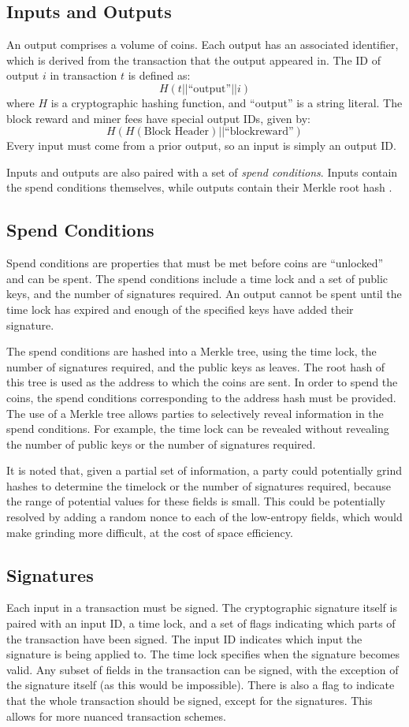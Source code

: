 \documentclass[twocolumn]{article}
\begin{document}
\subsection{Inputs and Outputs}
An output comprises a volume of coins.
Each output has an associated identifier, which is derived from the transaction that the output appeared in.
The ID of output $i$ in transaction $t$ is defined as:
\[
	H(t || \text{``output''} || i)
\]
where $H$ is a cryptographic hashing function, and ``output'' is a string literal.
The block reward and miner fees have special output IDs, given by:
\[
	H(H(\text{Block Header}) || \text{``blockreward''})
\]
Every input must come from a prior output, so an input is simply an output ID.

Inputs and outputs are also paired with a set of \textit{spend conditions}.
Inputs contain the spend conditions themselves, while outputs contain their Merkle root hash \cite{merkle}.

\subsection{Spend Conditions}
Spend conditions are properties that must be met before coins are ``unlocked'' and can be spent.
The spend conditions include a time lock and a set of public keys, and the number of signatures required.
An output cannot be spent until the time lock has expired and enough of the specified keys have added their signature.

The spend conditions are hashed into a Merkle tree, using the time lock, the number of signatures required, and the public keys as leaves.
The root hash of this tree is used as the address to which the coins are sent.
In order to spend the coins, the spend conditions corresponding to the address hash must be provided.
The use of a Merkle tree allows parties to selectively reveal information in the spend conditions.
For example, the time lock can be revealed without revealing the number of public keys or the number of signatures required.

It is noted that, given a partial set of information, a party could potentially grind hashes to determine the timelock or the number of signatures required, because the range of potential values for these fields is small.
This could be potentially resolved by adding a random nonce to each of the low-entropy fields, which would make grinding more difficult, at the cost of space efficiency.

\subsection{Signatures}
Each input in a transaction must be signed.
The cryptographic signature itself is paired with an input ID, a time lock, and a set of flags indicating which parts of the transaction have been signed.
The input ID indicates which input the signature is being applied to.
The time lock specifies when the signature becomes valid.
Any subset of fields in the transaction can be signed, with the exception of the signature itself (as this would be impossible).
There is also a flag to indicate that the whole transaction should be signed, except for the signatures.
This allows for more nuanced transaction schemes.
\end{document}

